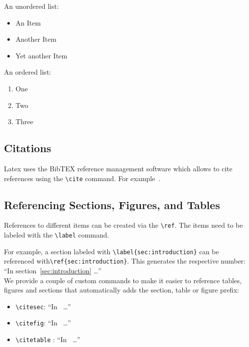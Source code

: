  An unordered list:
\begin{itemize}
  \item An Item
  \item Another Item
  \item Yet another Item
\end{itemize}

 An ordered list:
\begin{enumerate}
  \item One
  \item Two
  \item Three
\end{enumerate}

\subsection{Citations}

Latex uses the BibTEX reference management software which allows to cite references using the \verb|\cite| command.
For example~\cite{Turing1936}.


\subsection{Referencing Sections, Figures, and Tables}

References to different items can be created via the  \verb|\ref|.
The items need to be labeled with the \verb|\label| command.

For example, a section labeled with  \verb|\label{sec:introduction}| can be referenced with\newline \verb|\ref{sec:introduction}|. This generates the respective number: ``In section~\ref{sec:introduction} \ldots''\\

\bigskip
We provide a couple of custom commands to make it easier to reference tables, figures and sections that automatically adds the section, table or figure prefix: 

\begin{itemize}
    \item \verb|\citesec|:    ``In~ \ldots''
    \item \verb|\citefig|:    ``In~ \ldots''
    \item \verb|\citetable| : ``In~ \ldots''

\end{itemize}



